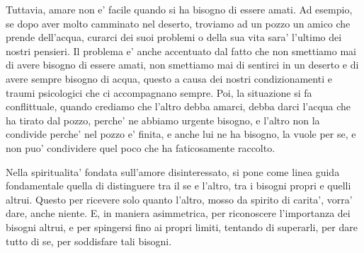 Tuttavia, amare non e' facile quando si ha bisogno di essere amati. Ad esempio, se dopo aver molto camminato nel deserto, troviamo ad un pozzo un amico che prende dell'acqua, curarci dei suoi problemi o della sua vita sara' l'ultimo dei nostri pensieri. Il problema e' anche accentuato dal fatto che non smettiamo mai di avere bisogno di essere amati, non smettiamo mai di sentirci in un deserto e di avere sempre bisogno di acqua, questo a causa dei nostri condizionamenti e traumi psicologici che ci accompagnano sempre. Poi, la situazione si fa conflittuale, quando crediamo che l'altro debba amarci, debba darci l'acqua che ha tirato dal pozzo, perche' ne abbiamo urgente bisogno, e l'altro non la condivide perche' nel pozzo e' finita, e anche lui ne ha bisogno, la vuole per se, e non puo' condividere quel poco che ha faticosamente raccolto.

Nella spiritualita' fondata sull'amore disinteressato, si pone come linea guida fondamentale quella di distinguere tra il se e l'altro, tra i bisogni propri e quelli altrui. Questo per ricevere solo quanto l'altro, mosso da spirito di carita', vorra' dare, anche niente. E, in maniera asimmetrica, per riconoscere l'importanza dei bisogni altrui, e per spingersi fino ai propri limiti, tentando di superarli, per dare tutto di se, per soddisfare tali bisogni.


